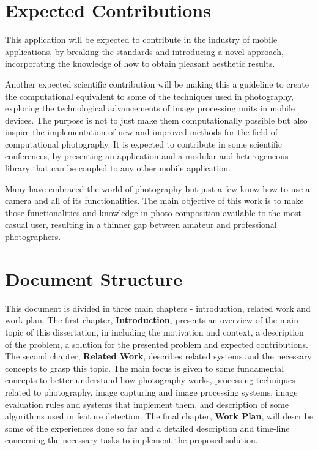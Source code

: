 \section{Expected Contributions}

This application will be expected to contribute in the industry of mobile applications, by breaking the standards and introducing a novel approach, incorporating the knowledge of how to obtain pleasant aesthetic results. 

Another expected scientific contribution will be making this a guideline to create the computational equivalent to some of the techniques used in photography, exploring the technological advancements of image processing units in mobile devices. The purpose is not to just make them computationally possible but also inspire the implementation of new and improved methods for the field of computational photography. It is expected to contribute in some scientific conferences, by presenting an application and a modular and heterogeneous library that can be coupled to any other mobile application.

Many have embraced the world of photography but just a few know how to use a camera and all of its functionalities. The main objective of this work is to make those functionalities and knowledge in photo composition available to the most casual user, resulting in a thinner gap between amateur and professional photographers.

\section{Document Structure}

This document is divided in three main chapters - introduction, related work and work plan. The first chapter, \textbf{Introduction}, presents an overview of the main topic of this dissertation, in including the motivation and context, a description of the problem, a solution for the presented problem and expected contributions.
The second chapter, \textbf{Related Work}, describes related systems and the necessary concepts to grasp this topic. The main focus is given to some fundamental concepts to better understand how photography works, processing techniques related to photography, image capturing and image processing systems, image evaluation rules and systems that implement them, and description of some algorithms used in feature detection. The final chapter, \textbf{Work Plan}, will describe some of the experiences done so far and a detailed description and time-line concerning the necessary tasks to implement the proposed solution.
